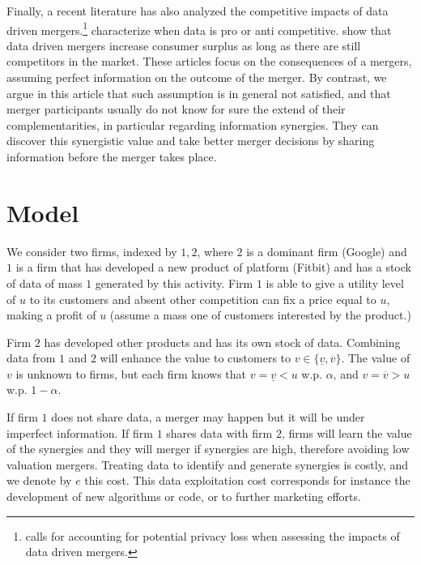 \documentclass[a4paper,leqno]{article}%
\renewcommand{\a}{\alpha}
\newcommand{\uv}{\underline{v}}
\newcommand{\ov}{\overline{v}}
\begin{document}
Finally, a recent literature has also analyzed the competitive impacts of data driven mergers.\footnote{\cite{chirita2018data} calls for accounting for potential privacy loss when assessing the impacts of data driven mergers.} \cite{de2020data} characterize when data is pro or anti competitive. \cite{chen2020data} show that data driven mergers increase consumer surplus as long as there are still competitors in the market. These articles focus on the consequences of a mergers, assuming perfect information on the outcome of the merger. By contrast, we argue in this article that such assumption is in general not satisfied, and that merger participants usually do not know for sure the extend of their complementarities, in particular regarding information synergies. They can discover this synergistic value and take better merger decisions by sharing information before the merger takes place.





\section{Model}\label{model}


We consider two firms, indexed by $1,2$, where $2$ is a dominant firm (Google) and $1$ is a firm that has developed a new product of platform (Fitbit) and has a stock of data of mass $1$ generated by this activity. Firm $1$ is able to give a utility level of $u$ to its customers and absent other competition can fix a price equal to $u$, making a profit of $u$ (assume a mass one of customers interested by the product.)


Firm $2$ has developed other products and has its own stock of data. Combining data from $1$ and $2$ will enhance the value to customers to $v\in\{\uv,\ov\}$. The value of $v$ is unknown to firms, but each firm knows that $v=\uv<u$ w.p. $\a$, and $v=\ov>u$ w.p. $1-\a$. 


If firm $1$ does not share data, a merger may happen but it will be under imperfect information. If firm $1$ shares data with firm $2$, firms will learn the value of the synergies and they will merger if synergies are high, therefore avoiding low valuation mergers. Treating data to identify and generate synergies is costly, and we denote by $e$ this cost. This data exploitation cost corresponds for instance the development of new algorithms or code, or to further marketing efforts. 
\end{document}
